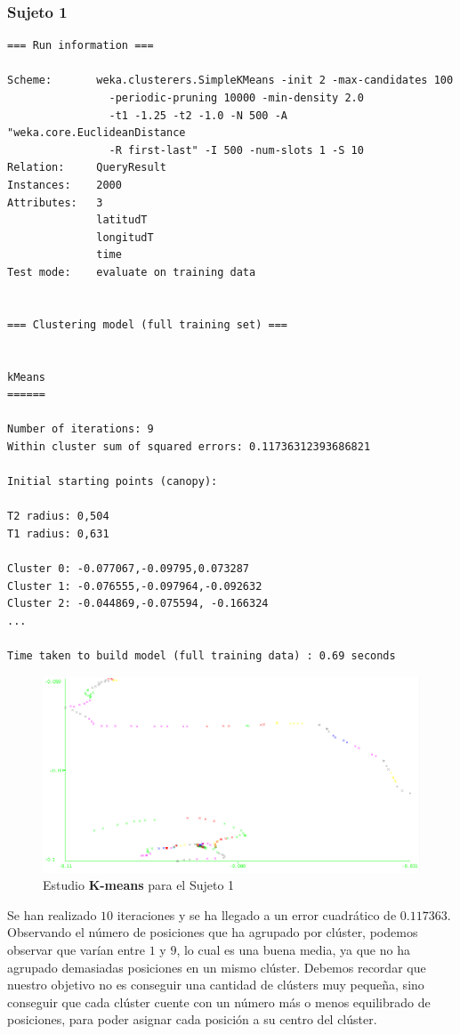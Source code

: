 \documentclass[a4paper, 12pt]{article}
\begin{document}
\subsubsection{Sujeto 1}

\begin{verbatim}
=== Run information ===

Scheme:       weka.clusterers.SimpleKMeans -init 2 -max-candidates 100 
				-periodic-pruning 10000 -min-density 2.0 
				-t1 -1.25 -t2 -1.0 -N 500 -A "weka.core.EuclideanDistance 
				-R first-last" -I 500 -num-slots 1 -S 10
Relation:     QueryResult
Instances:    2000
Attributes:   3
              latitudT
              longitudT
              time
Test mode:    evaluate on training data


=== Clustering model (full training set) ===


kMeans
======

Number of iterations: 9
Within cluster sum of squared errors: 0.11736312393686821

Initial starting points (canopy):

T2 radius: 0,504     
T1 radius: 0,631  

Cluster 0: -0.077067,-0.09795,0.073287
Cluster 1: -0.076555,-0.097964,-0.092632
Cluster 2: -0.044869,-0.075594, -0.166324
...

Time taken to build model (full training data) : 0.69 seconds
\end{verbatim}


\begin{figure}[H]
	\includegraphics[scale=.5]{../comparativa/kMeansSujeto1.png}
	\caption{Estudio \textbf{K-means} para el Sujeto 1}
\end{figure}

Se han realizado $10$ iteraciones y se ha llegado a un error cuadr\'atico de $0.117363$. Observando el n\'umero de posiciones que ha agrupado por cl\'uster, podemos observar que var\'ian entre $1$ y $9$, lo cual es una buena media, ya que no ha agrupado demasiadas posiciones en un mismo cl\'uster. Debemos recordar que nuestro objetivo no es conseguir una cantidad de cl\'usters muy peque\~na, sino conseguir que cada cl\'uster cuente con un n\'umero m\'as o menos equilibrado de posiciones, para poder asignar cada posici\'on a su centro del cl\'uster.\\ 
\end{document}
